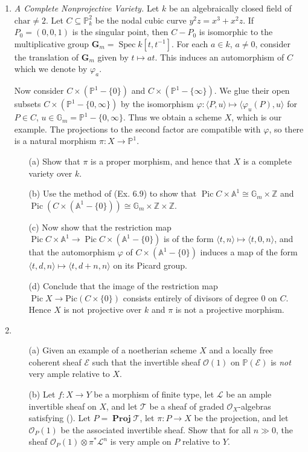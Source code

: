 \documentclass{article}
\newcommand{\fE}{\mathcal{E}}
\newcommand{\fO}{\mathcal{O}}
\newcommand{\fL}{\mathcal{L}}
\newcommand{\fT}{\mathcal{T}}
\newcommand{\PP}{\mathbb{P}}
\newcommand{\A}{\mathbb{A}}
\newcommand{\Z}{\mathbb{Z}}
\DeclareMathOperator{\bProj}{\mathbf{Proj}}
\DeclareMathOperator{\pic}{Pic}
\DeclareMathOperator{\spec}{Spec}
\begin{document}
\begin{enumerate} [label=\textbf{\arabic*.}, leftmargin=-0em]
\item \textit{A Complete Nonprojective Variety.} Let $k$ be an algebraically closed field of $\text{char} \neq 2$. Let $C \subseteq \PP_k^2$ be the nodal cubic curve $y^2 z = x^3 + x^2 z$. If $P_0 = (0, 0, 1)$ is the singular point, then $C - P_0$ is isomorphic to the multiplicative group $\mathbf{G}_m = \spec{k[t, t^{-1}]}$. For each $a \in k$, $a \neq 0$, consider the translation of $\mathbf{G}_m$ given by $t \mapsto at$. This induces an automorphism of $C$ which we denote by $\varphi_a$.

Now consider $C \times (\PP^1 - \{ 0 \})$ and $C \times (\PP^1 - \{\infty\})$. We glue their open subsets $C \times (\PP^1-\{0, \infty\})$ by the isomorphism $\varphi : \langle P, u \rangle \mapsto \langle \varphi_u(P), u \rangle$ for $P \in C$, $u \in \mathbb{G}_m = \PP^1 - \{0 , \infty \}$. Thus we obtain a scheme $X$, which is our example. The projections to the second factor are compatible with $\varphi$, so there is a natural morphism $\pi : X \to \PP^1$.
\begin{itemize}
    \item[(a)] Show that $\pi$ is a proper morphism, and hence that $X$ is a complete variety over $k$.
    \item[(b)] Use the method of (Ex. 6.9) to show that $\pic{C \times \A^1} \cong \mathbb{G}_m \times \Z$ and $\pic(C \times (\A^1 - \{0\})) \cong \mathbb{G}_m \times \Z \times \Z$.
    \item[(c)] Now show that the restriction map $\pic{C \times \A^1} \to \pic{C \times (\A^1 - \{0 \})}$ is of the form $\langle t, n \rangle \mapsto \langle t, 0, n \rangle$, and that the automorphism $\varphi$ of $C \times (\A^1 - \{ 0 \})$ induces a map of the form $\langle t, d, n \rangle \mapsto \langle t, d + n, n \rangle$ on its Picard group.
    \item[(d)] Conclude that the image of the restriction map $\pic{X} \to \text{Pic}(C \times \{0 \})$ consists entirely of divisors of degree $0$ on $C$. Hence $X$ is not projective over $k$ and $\pi$ is not a projective morphism.
\end{itemize}

\item \begin{itemize}
    \item[(a)] Given an example of a noetherian scheme $X$ and a locally free coherent sheaf $\fE$ such that the invertible sheaf $\fO(1)$ on $\PP(\fE)$ is \textit{not} very ample relative to $X$.
    \item[(b)] Let $f : X \to Y$ be a morphism of finite type, let $\fL$ be an ample invertible sheaf on $X$, and let $\fT$ be a sheaf of graded $\fO_X$-algebras satisfying (\dag). Let $P = \bProj{\fT}$, let $\pi : P \to X$ be the projection, and let $\fO_P(1)$ be the associated invertible sheaf. Show that for all $n \gg 0$, the sheaf $\fO_P(1) \otimes \pi^* \fL^n$ is very ample on $P$ relative to $Y$.
\end{itemize}

\end{enumerate}
\end{document}
